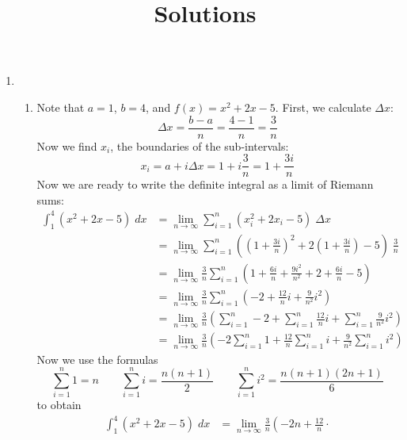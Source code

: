 \documentclass{article}
\title{\commonPSTitleZeroFourTwo\ Solutions}
\author{\commonAuthor}
\date{\commonDateZeroFourTwo}
\begin{document}
\maketitle
\thispagestyle{empty}

\noindent
\begin{enumerate}
\item %
  \begin{enumerate}
  \item Note that $a=1$, $b=4$, and
    $f(x)=x^2+2x-5$.  First, we calculate $\Delta x$:
    \begin{equation*}
      \Delta x = \frac{b-a}{n} = \frac{4-1}{n} = \frac{3}{n}
    \end{equation*}
    Now we find $x_i$, the boundaries of the sub-intervals:
    \begin{equation*}
      x_i = a + i \Delta x = 1 + i \frac{3}{n} = 1 + \frac{3i}{n}
    \end{equation*}
    Now we are ready to write the definite integral as a limit of
    Riemann sums:
    \begin{align*}
      \int_1^4 (x^2+2x-5) \; dx
      &= \lim_{n\to\infty} \sum_{i=1}^n (x_i^2+2x_i-5)\; \Delta x \\
      &= \lim_{n\to\infty} \sum_{i=1}^n \left( \left(1+\frac{3i}{n}\right)^2 +
        2\left(1+\frac{3i}{n}\right) - 5 \right) \; \frac{3}{n} \\
      &= \lim_{n\to\infty} \frac{3}{n} \sum_{i=1}^n \left( 1 + \frac{6i}{n} +
        \frac{9i^2}{n^2} + 2 + \frac{6i}{n} - 5 \right) 
      \\
      &= \lim_{n\to\infty} \frac{3}{n} \sum_{i=1}^n \left( -2 + \frac{12}{n} i +
        \frac{9}{n^2} i^2\right)
      \\
      &= \lim_{n\to\infty} \frac{3}{n} \left(\sum_{i=1}^n -2
        + \sum_{i=1}^n \frac{12}{n} i + \sum_{i=1}^n \frac{9}{n^2} i^2 \right)
      \\
      &= \lim_{n\to\infty} \frac{3}{n} \left( -2 \sum_{i=1}^n 1 +
        \frac{12}{n} \sum_{i=1}^n i + \frac{9}{n^2} \sum_{i=1}^n i^2
        \right)
    \end{align*}
    Now we use the formulas
    \begin{equation*}
      \sum_{i=1}^n 1 = n \qquad \sum_{i=1}^n i = \frac{n(n+1)}{2}
      \qquad \sum_{i=1}^n i^2 = \frac{n(n+1)(2n+1)}{6}
    \end{equation*}
    to obtain
    \begin{align*}
      \int_1^4 (x^2 + 2x - 5) \; dx
      &= \lim_{n\to\infty} \frac{3}{n} \left( -2 n + \frac{12}{n}\cdot

\end{align*}
\end{enumerate}
\end{enumerate}
\end{document}

